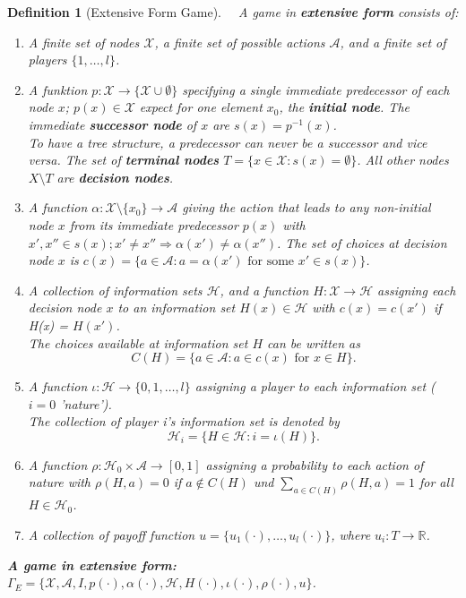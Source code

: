 \documentclass[12pt]{extreport} %
\newcommand{\R}{\mathbb{R}}
\theoremstyle{named}
\theoremstyle{itshape}
\newtheorem*{definition}{Definition}
\theoremstyle{normal}
\begin{document}
\begin{definition}[Extensive Form Game] ~\
	A game in \textbf{extensive form} consists of:
	\begin{enumerate}[label=(\roman*\upshape)]
		\item A finite set of nodes $\mathcal{X}$, a finite set of possible actions $\mathcal{A}$, and a finite set of players $\{1, \dotsc, l\}$.
		\item A funktion $p \colon \mathcal{X} \rightarrow \{ \mathcal{X} \cup \emptyset \}$ specifying a single immediate predecessor of each node $x$; $p(x) \in \mathcal{X}$ expect for one element $x_{0}$, the \textbf{initial node}. The immediate \textbf{successor node} of $x$ are $s(x) = p^{-1}(x)$. ~\\
			To have a tree structure, a predecessor can never be a successor and vice versa. The set of \textbf{terminal nodes} $T = \{ x \in \mathcal{X} \colon s(x) = \emptyset \}$. All other nodes $X \setminus T$ are \textbf{decision nodes}.
		\item A function $\alpha \colon \mathcal{X} \setminus \{ x_{0} \} \rightarrow \mathcal{A}$ giving the action that leads to any non-initial node $x$ from its immediate predecessor $p(x)$ with $x', x'' \in s(x); x' \neq x'' \Rightarrow \alpha(x') \neq \alpha(x'')$. The set of choices at decision node $x$ is $c(x) = \{ a \in \mathcal{A} \colon a = \alpha(x') \text{ for some } x' \in s(x) \}$.
		\item A collection of information sets $\mathcal{H}$, and a function $H \colon \mathcal{X} \rightarrow \mathcal{H}$ assigning each decision node $x$ to an information set $H(x) \in \mathcal{H}$ with $c(x) = c(x')$ if H(x) = $H(x')$. ~\\
			The choices available at information set $H$ can be written as
			$$ C(H) = \{ a \in \mathcal{A} \colon a \in c(x) \text{ for } x \in H \}. $$
		\item A function $\iota \colon \mathcal{H} \rightarrow \{ 0, 1, \dotsc, l \}$ assigning a player to each information set ($i = 0$ 'nature'). ~\\
			The collection of player i's information set is denoted by
			$$ \mathcal{H}_i = \{ H \in \mathcal{H} \colon i = \iota(H) \}. $$
		\item A function $\rho \colon \mathcal{H}_0 \times \mathcal{A} \rightarrow [0,1]$ assigning a probability to each action of nature with $\rho(H,a) = 0$ if $a \notin C(H)$ und $\sum_{a \in C(H)} \rho(H, a) = 1$ for all $H \in \mathcal{H}_{0}$.
		\item A collection of payoff function $u = \{ u_1(\cdot), \dotsc, u_l(\cdot) \}$, where $u_i \colon T \rightarrow \R$.
	\end{enumerate}
	\textbf{A game in extensive form:} $\Gamma_E = \{ \mathcal{X}, \mathcal{A}, I, p(\cdot), \alpha(\cdot), \mathcal{H}, H(\cdot), \iota(\cdot), \rho(\cdot), u \}$.
\end{definition}
\end{document}
